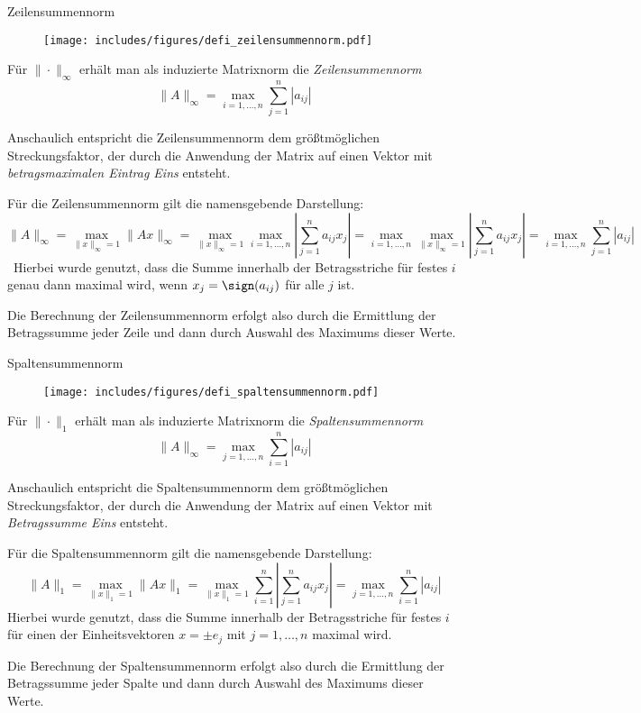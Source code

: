 \begin{defi}{Zeilensummennorm}
    \begin{wrapfigure}{r}{0.4\textwidth}
        \texttt{[image: includes/figures/defi\_zeilensummennorm.pdf]}
    \end{wrapfigure}
    Für $\| \cdot \|_\infty$ erhält man als induzierte Matrixnorm die \emph{Zeilensummennorm}
    \[
        \| A \|_\infty = \max_{i = 1, \ldots, n} \sum_{j = 1}^{n} | a_{ij} |
    \]

    Anschaulich entspricht die Zeilensummennorm dem größtmöglichen Streckungsfaktor, der durch die Anwendung der Matrix auf einen Vektor mit \emph{betragsmaximalen Eintrag Eins} entsteht.

    Für die Zeilensummennorm gilt die namensgebende Darstellung:
    \[
        \| A \|_\infty = \max_{\| x \|_\infty = 1} \| Ax \|_\infty = \max_{\| x \|_\infty = 1} \max_{i=1, \ldots ,n} \left| \sum_{j=1}^n a_{ij} x_j \right| = \max_{i=1, \ldots ,n} \max_{\| x \|_\infty = 1} \left| \sum_{j=1}^n a_{ij} x_j \right| = \max_{i=1, \ldots ,n}{\sum_{j=1}^n | a_{ij} |}
    \]\
    Hierbei wurde genutzt, dass die Summe innerhalb der Betragsstriche für festes $i$ genau dann maximal wird, wenn $x_j = \sign(a_{ij})$ für alle $j$ ist.

    Die Berechnung der Zeilensummennorm erfolgt also durch die Ermittlung der Betragssumme jeder Zeile und dann durch Auswahl des Maximums dieser Werte.
\end{defi}

\begin{defi}{Spaltensummennorm}
    \begin{wrapfigure}{r}{0.4\textwidth}
        \texttt{[image: includes/figures/defi\_spaltensummennorm.pdf]}
    \end{wrapfigure}
    Für $\| \cdot \|_1$ erhält man als induzierte Matrixnorm die \emph{Spaltensummennorm}
    \[
        \| A \|_\infty = \max_{j = 1, \ldots, n} \sum_{i = 1}^{n} | a_{ij} |
    \]

    Anschaulich entspricht die Spaltensummennorm dem größtmöglichen Streckungsfaktor, der durch die Anwendung der Matrix auf einen Vektor mit \emph{Betragssumme Eins} entsteht.

    Für die Spaltensummennorm gilt die namensgebende Darstellung:
    \[
        \|A\|_{1}=\max _{\|x\|_{1}=1}\|Ax\|_{1}=\max _{\|x\|_{1}=1}\sum _{i=1}^{n}\left|\sum _{j=1}^{n}a_{ij}x_{j}\right|=\max _{j=1,\ldots ,n}\sum _{i=1}^{n}|a_{ij}|
    \]
    Hierbei wurde genutzt, dass die Summe innerhalb der Betragsstriche für festes $i$ für einen der Einheitsvektoren $x = \pm e_j$ mit $j = 1, \ldots ,n$ maximal wird.

    Die Berechnung der Spaltensummennorm erfolgt also durch die Ermittlung der Betragssumme jeder Spalte und dann durch Auswahl des Maximums dieser Werte.
\end{defi}

